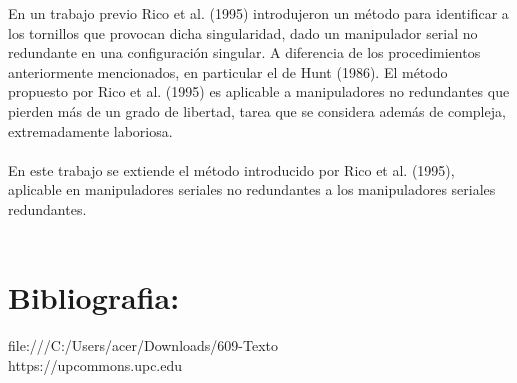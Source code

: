 \documentclass[12pt,a4paper]{article}
\begin{document}
En un trabajo previo Rico et al. (1995) introdujeron un método para identificar a los tornillos que provocan dicha singularidad, dado un manipulador serial no redundante en una configuración singular. A diferencia de los procedimientos anteriormente mencionados, en particular el de Hunt (1986). El método propuesto por Rico et al. (1995) es aplicable a manipuladores no redundantes que pierden más de un grado de libertad, tarea que se considera además de compleja, extremadamente laboriosa.\\\\
En este trabajo se extiende el método introducido por Rico et al. (1995), aplicable en manipuladores seriales no redundantes a los manipuladores seriales redundantes.\\\\

\section{Bibliografia:}
file:///C:/Users/acer/Downloads/609-Texto\\
https://upcommons.upc.edu
\end{document}
